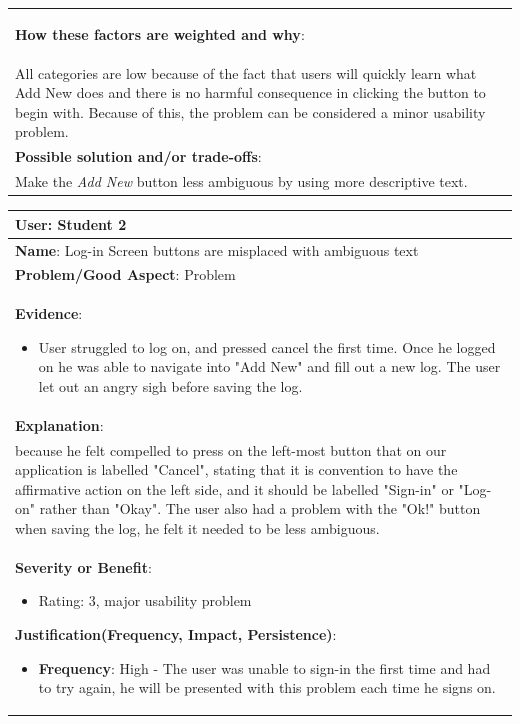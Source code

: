\documentclass[pdftex,12pt,a4paper]{report}
\begin{document}
\begin{center}
\begin{longtable}{|p{\textwidth}|}
\begin{itemize}
	\end{itemize}
	\textbf{How these factors are weighted and why}:\\
	All categories are low because of the fact that users will quickly learn what Add New does and there is no harmful consequence in clicking the button to begin with. Because of this, the problem can be considered a minor usability problem.\\
	\hline
	\textbf{Possible solution and/or trade-offs}:\\
	Make the \emph{Add New} button less ambiguous by using more descriptive text.\\
	\hline
	\end{longtable}
\end{center}

\begin{center}
	\begin{longtable}{|p{\textwidth}|}
	\hline
	\textbf{User}: Student 2\\
	\hline
	\textbf{Name}: Log-in Screen buttons are misplaced with ambiguous text\\
	\hline
	\textbf{Problem/Good Aspect}: Problem\\
	\hline
	\textbf{Evidence}:
	\begin{itemize}
	\item{User struggled to log on, and pressed cancel the first time. Once he logged on he was able to navigate into "Add New" and fill out a new log. The user let out an angry sigh before saving the log.}
	\end{itemize}\\
	\hline
	\textbf{Explanation}:\\
	because he felt compelled to press on the left-most button that on our application is labelled "Cancel", stating that it is convention to have the affirmative action on the left side, and it should be labelled "Sign-in" or "Log-on" rather than "Okay". The user also had a problem with the "Ok!" button when saving the log, he felt it needed to be less ambiguous.\\
	\hline
	\textbf{Severity or Benefit}:
	\begin{itemize}
	\item{Rating: 3, major usability problem}
	\end{itemize}
	\textbf{Justification(Frequency, Impact, Persistence)}:
	\begin{itemize}
	\item{\textbf{Frequency}:} High - The user was unable to sign-in the first time and had to try again, he will be presented with this problem each time he signs on.

\end{itemize}
\end{longtable}
\end{center}
\end{document}
